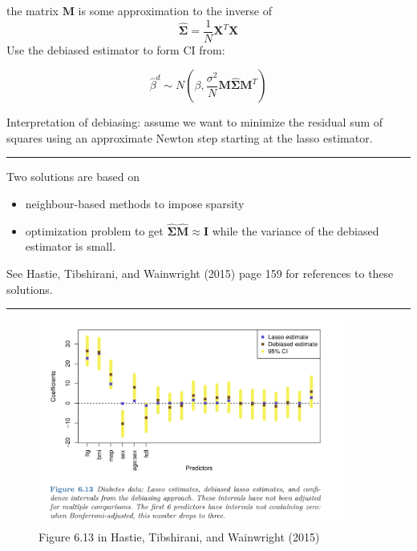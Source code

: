 \documentclass[
  letterpaper,
  DIV=11,
  numbers=noendperiod]{scrartcl}
\providecommand{\tightlist}{%
  \setlength{\itemsep}{0pt}\setlength{\parskip}{0pt}}\usepackage{longtable,booktabs,array}
\begin{document}
the matrix \({\boldsymbol M}\) is some approximation to the inverse of
\[\hat{\boldsymbol \Sigma}=\frac{1}{N}{\boldsymbol X}^T{\boldsymbol X}\]
Use the debiased estimator to form CI from:

\[\hat{\beta}^d \sim N(\beta,\frac{\sigma^2}{N}{\boldsymbol M}\hat{\boldsymbol \Sigma}{\boldsymbol M}^T)\]

Interpretation of debiasing: assume we want to minimize the residual sum
of squares using an approximate Newton step starting at the lasso
estimator.

\begin{center}\rule{0.5\linewidth}{0.5pt}\end{center}

Two solutions are based on

\begin{itemize}
\tightlist
\item
  neighbour-based methods to impose sparsity
\item
  optimization problem to get
  \(\hat{\boldsymbol \Sigma}\hat{\boldsymbol M}\approx \boldsymbol I\)
  while the variance of the debiased estimator is small.
\end{itemize}

See Hastie, Tibshirani, and Wainwright (2015) page 159 for references to
these solutions.

\begin{center}\rule{0.5\linewidth}{0.5pt}\end{center}

\begin{figure}

{\centering \includegraphics[width=0.9\textwidth,height=\textheight]{./HTWFig613.jpg}

}

\caption{Figure 6.13 in Hastie, Tibshirani, and Wainwright (2015)}

\end{figure}
\end{document}
